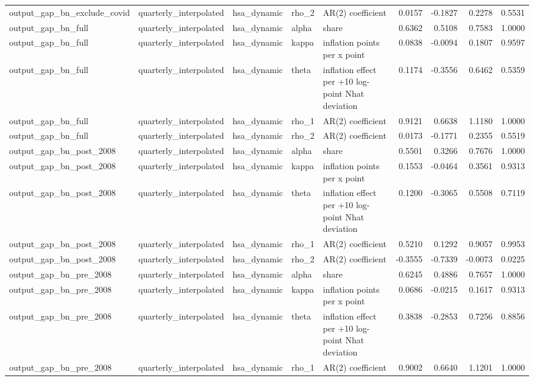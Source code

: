 \begin{tabular}{lllllrrrr}
output\_gap\_bn\_exclude\_covid & quarterly\_interpolated & hsa\_dynamic & rho\_2 & AR(2) coefficient & 0.0157 & -0.1827 & 0.2278 & 0.5531 \\
output\_gap\_bn\_full & quarterly\_interpolated & hsa\_dynamic & alpha & share & 0.6362 & 0.5108 & 0.7583 & 1.0000 \\
output\_gap\_bn\_full & quarterly\_interpolated & hsa\_dynamic & kappa & inflation points per x point & 0.0838 & -0.0094 & 0.1807 & 0.9597 \\
output\_gap\_bn\_full & quarterly\_interpolated & hsa\_dynamic & theta & inflation effect per +10 log-point Nhat deviation & 0.1174 & -0.3556 & 0.6462 & 0.5359 \\
output\_gap\_bn\_full & quarterly\_interpolated & hsa\_dynamic & rho\_1 & AR(2) coefficient & 0.9121 & 0.6638 & 1.1180 & 1.0000 \\
output\_gap\_bn\_full & quarterly\_interpolated & hsa\_dynamic & rho\_2 & AR(2) coefficient & 0.0173 & -0.1771 & 0.2355 & 0.5519 \\
output\_gap\_bn\_post\_2008 & quarterly\_interpolated & hsa\_dynamic & alpha & share & 0.5501 & 0.3266 & 0.7676 & 1.0000 \\
output\_gap\_bn\_post\_2008 & quarterly\_interpolated & hsa\_dynamic & kappa & inflation points per x point & 0.1553 & -0.0464 & 0.3561 & 0.9313 \\
output\_gap\_bn\_post\_2008 & quarterly\_interpolated & hsa\_dynamic & theta & inflation effect per +10 log-point Nhat deviation & 0.1200 & -0.3065 & 0.5508 & 0.7119 \\
output\_gap\_bn\_post\_2008 & quarterly\_interpolated & hsa\_dynamic & rho\_1 & AR(2) coefficient & 0.5210 & 0.1292 & 0.9057 & 0.9953 \\
output\_gap\_bn\_post\_2008 & quarterly\_interpolated & hsa\_dynamic & rho\_2 & AR(2) coefficient & -0.3555 & -0.7339 & -0.0073 & 0.0225 \\
output\_gap\_bn\_pre\_2008 & quarterly\_interpolated & hsa\_dynamic & alpha & share & 0.6245 & 0.4886 & 0.7657 & 1.0000 \\
output\_gap\_bn\_pre\_2008 & quarterly\_interpolated & hsa\_dynamic & kappa & inflation points per x point & 0.0686 & -0.0215 & 0.1617 & 0.9313 \\
output\_gap\_bn\_pre\_2008 & quarterly\_interpolated & hsa\_dynamic & theta & inflation effect per +10 log-point Nhat deviation & 0.3838 & -0.2853 & 0.7256 & 0.8856 \\
output\_gap\_bn\_pre\_2008 & quarterly\_interpolated & hsa\_dynamic & rho\_1 & AR(2) coefficient & 0.9002 & 0.6640 & 1.1201 & 1.0000 \\

\end{tabular}
